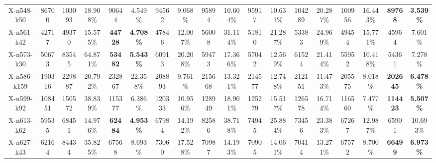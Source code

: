 \documentclass{article}
\theoremstyle{plain}
\theoremstyle{definition}
\theoremstyle{remark}
\begin{document}
\begin{table}[htbp]
\begin{center}
\begin{small}
{\begin{tabular}{cc|cccccccccccccccc}
X-n548-k50       & 86700      & 103093       & 18.908\%      & 90644           & 4.549\%          & 94562        & 9.068\%       & 95894        & 10.604\%      & 95917         & 10.631\%       & 104289          & 20.287\%          & 100956          & 16.443\%          & \cellcolor[HTML]{D0CECE}\textbf{89768}   & \cellcolor[HTML]{D0CECE}\textbf{3.539\%}  \\
X-n561-k42       & 42717      & 49370        & 15.575\%      & \cellcolor[HTML]{D0CECE}\textbf{44728}  & \cellcolor[HTML]{D0CECE}\textbf{4.708\%} & 47846        & 12.007\%      & 56008        & 31.114\%      & 51810         & 21.287\%       & 53383           & 24.969\%          & 49454           & 15.771\%          & 45964            & 7.601\%           \\
X-n573-k30       & 50673      & 83545        & 64.871\%      & \cellcolor[HTML]{D0CECE}\textbf{53482}  & \cellcolor[HTML]{D0CECE}\textbf{5.543\%} & 60913        & 20.208\%      & 59473        & 17.366\%      & 57042         & 12.569\%       & 61524           & 21.414\%          & 55952           & 10.418\%          & 54361            & 7.278\%           \\
X-n586-k159      & 190316     & 229887       & 20.792\%      & 232867          & 22.358\%         & 208893       & 9.761\%       & 215668       & 13.321\%      & 214577        & 12.748\%       & 212151          & 11.473\%          & 205575          & 8.018\%           & \cellcolor[HTML]{D0CECE}\textbf{202645}  & \cellcolor[HTML]{D0CECE}\textbf{6.478\%}  \\
X-n599-k92       & 108451     & 150572       & 38.839\%      & 115377          & 6.386\%          & 120333       & 10.956\%      & 128949       & 18.901\%      & 125279        & 15.517\%       & 126578          & 16.714\%          & 116560          & 7.477\%           & \cellcolor[HTML]{D0CECE}\textbf{114423}  & \cellcolor[HTML]{D0CECE}\textbf{5.507\%}  \\
X-n613-k62       & 59535      & 68451        & 14.976\%      & \cellcolor[HTML]{D0CECE}\textbf{62484}  & \cellcolor[HTML]{D0CECE}\textbf{4.953\%} & 67984        & 14.192\%      & 82586        & 38.718\%      & 74945         & 25.884\%       & 73456           & 23.383\%          & 67267           & 12.987\%          & 65901            & 10.693\%          \\
X-n627-k43       & 62164      & 84434        & 35.825\%      & 67568           & 8.693\%          & 73060        & 17.528\%      & 70987        & 14.193\%      & 70905         & 14.061\%       & 70414           & 13.271\%          & 67572           & 8.700\%           & \cellcolor[HTML]{D0CECE}\textbf{66499}   & \cellcolor[HTML]{D0CECE}\textbf{6.973\%}  \\

\end{tabular}}
\end{small}
\end{center}
\end{table}
\end{document}

